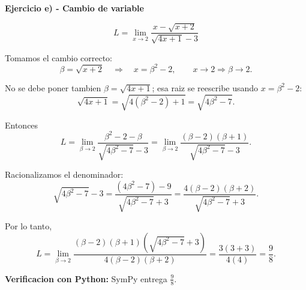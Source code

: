 \documentclass[11pt]{article}
\begin{document}
\thispagestyle{empty}

\begin{center}
    {\Large\textbf{Ejercicio e) - Cambio de variable}}
\end{center}

\[
L=\lim_{x\to 2}\frac{x-\sqrt{x+2}}{\sqrt{4x+1}-3}
\]

\noindent Tomamos el cambio correcto:
\[
\beta=\sqrt{x+2}
\quad\Rightarrow\quad
x=\beta^2-2,
\qquad
x\to 2 \Rightarrow \beta\to 2.
\]

\noindent No se debe poner tambien \(\beta=\sqrt{4x+1}\); esa raiz se
reescribe usando \(x=\beta^2-2\):
\[
\sqrt{4x+1}
=\sqrt{4(\beta^2-2)+1}
=\sqrt{4\beta^2-7}.
\]

Entonces
\[
L=
\lim_{\beta\to 2}
\frac{\beta^2-2-\beta}{\sqrt{4\beta^2-7}-3}
=
\lim_{\beta\to 2}
\frac{(\beta-2)(\beta+1)}{\sqrt{4\beta^2-7}-3}.
\]

Racionalizamos el denominador:
\[
\sqrt{4\beta^2-7}-3
=
\frac{(4\beta^2-7)-9}{\sqrt{4\beta^2-7}+3}
=
\frac{4(\beta-2)(\beta+2)}{\sqrt{4\beta^2-7}+3}.
\]

Por lo tanto,
\[
L=
\lim_{\beta\to 2}
\frac{(\beta-2)(\beta+1)(\sqrt{4\beta^2-7}+3)}
{4(\beta-2)(\beta+2)}
=
\frac{3(3+3)}{4(4)}
=
\boxed{\frac{9}{8}}.
\]

\vspace{0.4cm}
\noindent\textbf{Verificacion con Python:} SymPy entrega \(\frac{9}{8}\).
\end{document}
